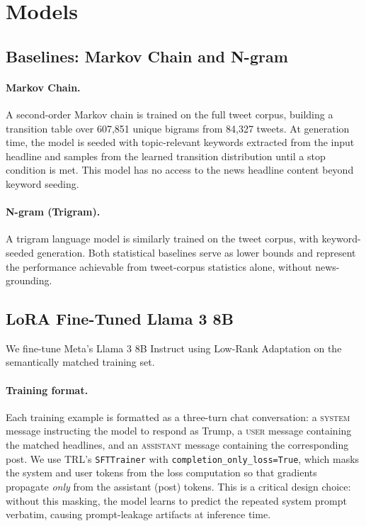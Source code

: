 \documentclass[11pt,a4paper]{article}
\begin{document}
\section{Models}

\subsection{Baselines: Markov Chain and N-gram}

\paragraph{Markov Chain.}
A second-order Markov chain is trained on the full tweet corpus, building a transition table over 607,851 unique bigrams from 84,327 tweets. At generation time, the model is seeded with topic-relevant keywords extracted from the input headline and samples from the learned transition distribution until a stop condition is met. This model has no access to the news headline content beyond keyword seeding.

\paragraph{N-gram (Trigram).}
A trigram language model is similarly trained on the tweet corpus, with keyword-seeded generation. Both statistical baselines serve as lower bounds and represent the performance achievable from tweet-corpus statistics alone, without news-grounding.

\subsection{LoRA Fine-Tuned Llama 3 8B}

We fine-tune Meta's Llama 3 8B Instruct \citep{dubey2024llama} using Low-Rank Adaptation \citep{hu2022lora} on the semantically matched training set.

\paragraph{Training format.}
Each training example is formatted as a three-turn chat conversation: a \textsc{system} message instructing the model to respond as Trump, a \textsc{user} message containing the matched headlines, and an \textsc{assistant} message containing the corresponding post. We use TRL's \texttt{SFTTrainer} with \texttt{completion\_only\_loss=True}, which masks the system and user tokens from the loss computation so that gradients propagate \emph{only} from the assistant (post) tokens. This is a critical design choice: without this masking, the model learns to predict the repeated system prompt verbatim, causing prompt-leakage artifacts at inference time.
\end{document}
